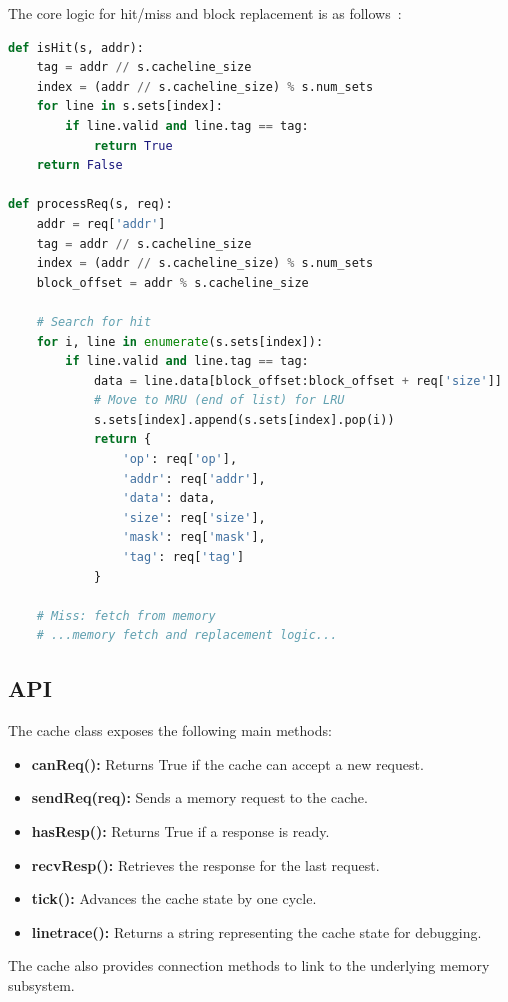\documentclass[12pt,a4paper]{report}
\begin{document}
The core logic for hit/miss and block replacement is as follows~\cite{gfg_lru_cache,sciencedirect_set_associative}:

\begin{lstlisting}[language=Python]
def isHit(s, addr):
    tag = addr // s.cacheline_size
    index = (addr // s.cacheline_size) % s.num_sets
    for line in s.sets[index]:
        if line.valid and line.tag == tag:
            return True
    return False

def processReq(s, req):
    addr = req['addr']
    tag = addr // s.cacheline_size
    index = (addr // s.cacheline_size) % s.num_sets
    block_offset = addr % s.cacheline_size

    # Search for hit
    for i, line in enumerate(s.sets[index]):
        if line.valid and line.tag == tag:
            data = line.data[block_offset:block_offset + req['size']]
            # Move to MRU (end of list) for LRU
            s.sets[index].append(s.sets[index].pop(i))
            return {
                'op': req['op'],
                'addr': req['addr'],
                'data': data,
                'size': req['size'],
                'mask': req['mask'],
                'tag': req['tag']
            }

    # Miss: fetch from memory
    # ...memory fetch and replacement logic...
\end{lstlisting}

\subsection{API}
The cache class exposes the following main methods:
\begin{itemize}
  \item \textbf{canReq():} Returns True if the cache can accept a new request.
  \item \textbf{sendReq(req):} Sends a memory request to the cache.
  \item \textbf{hasResp():} Returns True if a response is ready.
  \item \textbf{recvResp():} Retrieves the response for the last request.
  \item \textbf{tick():} Advances the cache state by one cycle.
  \item \textbf{linetrace():} Returns a string representing the cache state for debugging.
\end{itemize}
The cache also provides connection methods to link to the underlying memory subsystem.
\end{document}

